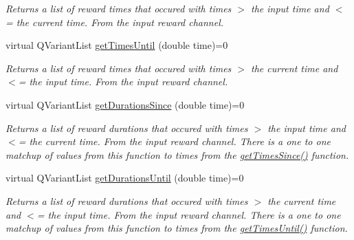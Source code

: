 \begin{DoxyCompactItemize}
\begin{DoxyCompactList}\small\item\em Returns a list of reward times that occured with times $>$ the input time and $<$= the current time. From the input reward channel. \end{DoxyCompactList}\item 
\hypertarget{class_picto_1_1_reward_reader_a30fc72e4b54ce56a3ae4464d9ad22cff}{virtual Q\-Variant\-List \hyperlink{class_picto_1_1_reward_reader_a30fc72e4b54ce56a3ae4464d9ad22cff}{get\-Times\-Until} (double time)=0}\label{class_picto_1_1_reward_reader_a30fc72e4b54ce56a3ae4464d9ad22cff}

\begin{DoxyCompactList}\small\item\em Returns a list of reward times that occured with times $>$ the current time and $<$= the input time. From the input reward channel. \end{DoxyCompactList}\item 
\hypertarget{class_picto_1_1_reward_reader_a4d502f594b1ae3c267ffc72c1f0ce42f}{virtual Q\-Variant\-List \hyperlink{class_picto_1_1_reward_reader_a4d502f594b1ae3c267ffc72c1f0ce42f}{get\-Durations\-Since} (double time)=0}\label{class_picto_1_1_reward_reader_a4d502f594b1ae3c267ffc72c1f0ce42f}

\begin{DoxyCompactList}\small\item\em Returns a list of reward durations that occured with times $>$ the input time and $<$= the current time. From the input reward channel. There is a one to one matchup of values from this function to times from the \hyperlink{class_picto_1_1_reward_reader_ac5cbb012865d274c25a3def3c0ef150c}{get\-Times\-Since()} function. \end{DoxyCompactList}\item 
\hypertarget{class_picto_1_1_reward_reader_a47b8b27246396f9b6cbc88e52168c8da}{virtual Q\-Variant\-List \hyperlink{class_picto_1_1_reward_reader_a47b8b27246396f9b6cbc88e52168c8da}{get\-Durations\-Until} (double time)=0}\label{class_picto_1_1_reward_reader_a47b8b27246396f9b6cbc88e52168c8da}

\begin{DoxyCompactList}\small\item\em Returns a list of reward durations that occured with times $>$ the current time and $<$= the input time. From the input reward channel. There is a one to one matchup of values from this function to times from the \hyperlink{class_picto_1_1_reward_reader_a30fc72e4b54ce56a3ae4464d9ad22cff}{get\-Times\-Until()} function. \end{DoxyCompactList}\end{DoxyCompactItemize}


